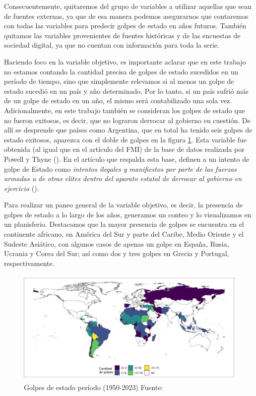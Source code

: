 \documentclass{article}
\begin{document}
Consecuentemente, quitaremos del grupo de variables a utilizar aquellas que sean de
fuentes externas, ya que de esa manera podemos asegurarnos que contaremos con todas
las variables para predecir golpes de estado en años futuros. También quitamos las
variables provenientes de fuentes históricas y de las encuestas de sociedad digital,
ya que no cuentan con información para toda la serie.

Haciendo foco en la variable objetivo, es importante aclarar que en este trabajo no 
estamos contando la cantidad precisa
de golpes de estado sucedidos en un período de tiempo, sino que simplemente relevamos
si al menos un golpe de estado sucedió en un país y año determinado. Por lo tanto, si
un país sufrió más de un golpe de estado en un año, el mismo será contabilizado una
sola vez. Adicionalmente, en este trabajo también se consideran los golpes de estado
que no fueron exitosos, es decir, que no lograron derrocar al gobierno en cuestión. 
De allí se desprende que países como Argentina, que en total ha tenido seis golpes de 
estado exitosos, aparezca con el doble de golpes en la figura \ref{fig::mapa_golpes}.
Esta variable fue obtenida (al igual que en el artículo del FMI) de la base de datos
realizada por Powell y Thyne (\citeyear{Pow11}). En el artículo que respalda esta base, 
definen a un intento de golpe de Estado como \textit{intentos ilegales y manifiestos por parte 
de las fuerzas armadas u de otras elites dentro del aparato estatal de derrocar al 
gobierno en ejercicio} (\cite[p.~252]{Pow11}).


Para realizar un paneo general de la variable objetivo, es decir, la presencia de
golpes de estado a lo largo de los años, generamos un conteo y lo visualizamos en un 
planisferio. Destacamos que la mayor presencia de golpes se encuentra en el 
continente africano, en América del Sur y parte del Caribe, Medio Oriente y el 
Sudeste Asiático, con algunos casos de apenas un golpe en España, Rusia, Ucrania 
y Corea del Sur; así como dos y tres golpes en Grecia y Portugal, respectivamente.

\begin{figure}[H]
  \centering  
  \includegraphics[width=1\textwidth]{2_golpes.png}
  \caption{Golpes de estado período (1950-2023) Fuente: \cite{Pow11} \label{fig::mapa_golpes}}
\end{figure}
\end{document}
